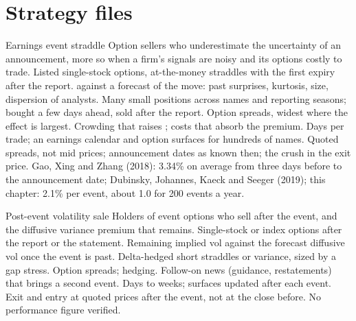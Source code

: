 \section{Strategy files}

\begin{strategyfile}{Earnings event straddle}\label{strat:s2:gamma-scalping-and-event-volatility:earnings}
 Option sellers who underestimate the uncertainty of an announcement, more so when a firm's signals are noisy and its
options costly to trade.
 Listed single-stock options, at-the-money straddles with the first expiry after the report.
  against a forecast of the move: past surprises, kurtosis, size, dispersion of analysts.
 Many small positions across names and reporting seasons; bought a few days ahead, sold after the report.
 Option spreads, widest where the effect is largest.
 Crowding that raises ; costs that absorb the premium.
 Days per trade; an earnings calendar and option surfaces for hundreds of names.
 Quoted spreads, not mid prices; announcement dates as known then; the crush in the exit price.
 Gao, Xing and Zhang (2018): 3.34\% on average from three days before to the announcement date; Dubinsky, Johannes, Kaeck and Seeger
(2019); this chapter: 2.1\% per event, about 1.0 for 200 events a year.
\end{strategyfile}

\begin{strategyfile}{Post-event volatility sale}\label{strat:s2:gamma-scalping-and-event-volatility:postevent}
 Holders of event options who sell after the event, and the diffusive variance premium that remains.
 Single-stock or index options after the report or the statement.
 Remaining implied vol against the forecast diffusive vol once the event is past.
 Delta-hedged short straddles or variance, sized by a gap stress.
 Option spreads; hedging.
 Follow-on news (guidance, restatements) that brings a second event.
 Days to weeks; surfaces updated after each event.
 Exit and entry at quoted prices after the event, not at the close before.
 No performance figure verified.
\end{strategyfile}


